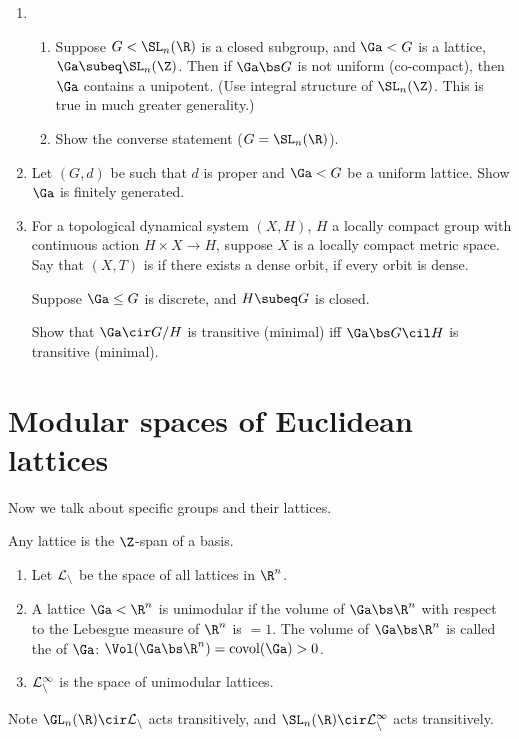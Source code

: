 \begin{exr}
\begin{enumerate}
\item
\begin{enumerate}
\item
Suppose $G< \SL_n(\R)$ is a closed subgroup, and $\Ga<G$ is a lattice, $\Ga\subeq \SL_n(\Z)$. Then if $\Ga\bs G$ is not uniform (co-compact), then $\Ga$ contains a unipotent. (Use integral structure of $\SL_n(\Z)$. This is true in much greater generality.)
\item
Show the converse statement ($G=\SL_n(\R)$). 
\end{enumerate}
\item
Let $(G,d)$ be such that $d$ is proper and $\Ga<G$ be a uniform lattice. Show $\Ga$ is finitely generated.
\item
\begin{df}
For a topological dynamical system $(X,H)$, $H$ a locally compact group with continuous action $H\times X\to H$, suppose $X$ is a locally compact metric space. %
Say that $(X,T)$ is  if there exists a dense orbit,  if every orbit is dense.
\end{df}
Suppose $\Ga\le G$ is discrete, and $H\subeq G$ is closed.

Show that $\Ga\cir G/H$ is transitive (minimal) iff $\Ga\bs G\cil H$ is transitive (minimal). 
\end{enumerate}
\end{exr}

\section{Modular spaces of Euclidean lattices}
Now we talk about specific groups and their lattices. 

Any lattice is the $\Z$-span of a basis. 
\begin{df}
\begin{enumerate}
\item
Let $\cal L_n$ be the space of all lattices in $\R^n$.
\item
A lattice $\Ga< \R^n$ is unimodular if the volume of $\Ga\bs \R^n$ with respect to the Lebesgue measure of $\R^n$ is $=1$. The volume of $\Ga\bs \R^n$ is called the  of $\Ga$: 
 $\Vol (\Ga\bs \R^n) = \text{covol}(\Ga)>0$. 
\item
$\cal L_n^1$ is the space of unimodular lattices.
\end{enumerate}
\end{df}
Note $\GL_n(\R) \cir \cal L_n$ acts transitively, and $\SL_n(\R) \cir \cal L_n^1$ acts transitively. 

